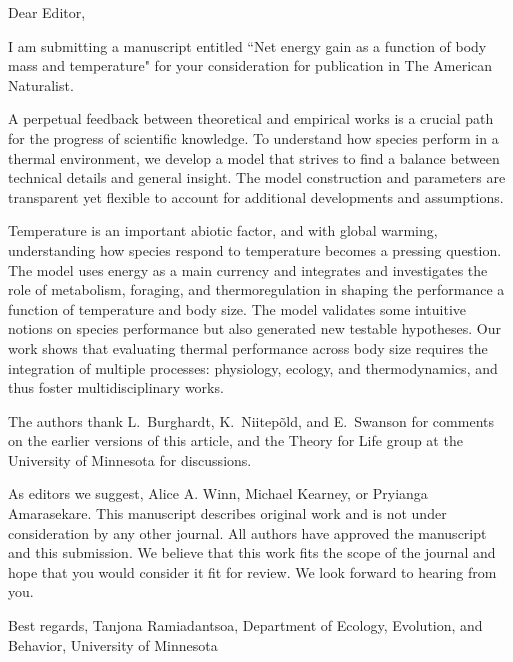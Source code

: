 Dear Editor,

I am submitting a manuscript entitled ``Net energy gain as a function of body mass and temperature" for your consideration for publication in The American Naturalist.

A perpetual feedback between theoretical and empirical works is a crucial path for the progress of scientific knowledge.
To understand how species perform in a thermal environment, we develop a model that strives to find a balance between technical details and general insight.
The model construction and parameters are transparent yet flexible to account for additional developments and  assumptions.

Temperature is an important abiotic factor, and with global warming, understanding how species respond to temperature becomes a pressing question.
The model uses energy as a main currency and integrates and investigates the role of metabolism, foraging, and thermoregulation in shaping the performance a function of temperature and body size.
The model validates some intuitive notions on species performance but also generated new testable hypotheses.
Our work shows that evaluating thermal performance across body size requires the integration of multiple processes: physiology, ecology, and thermodynamics, and thus foster multidisciplinary works.

The authors thank L.\ Burghardt, K.\ Niitep\~{o}ld, and E.\ Swanson for comments on the earlier versions of this article, and the Theory for Life group at the University of Minnesota for discussions.

As editors we suggest, Alice A. Winn, Michael Kearney, or Pryianga Amarasekare.
This manuscript describes original work and is not under consideration by any other journal.
All authors have approved the manuscript and this submission.
We believe that this work fits the scope of the journal and hope that you would consider it fit for review.
We look forward to hearing from you.

Best regards,
Tanjona Ramiadantsoa,
Department of Ecology, Evolution, and Behavior, University of Minnesota

